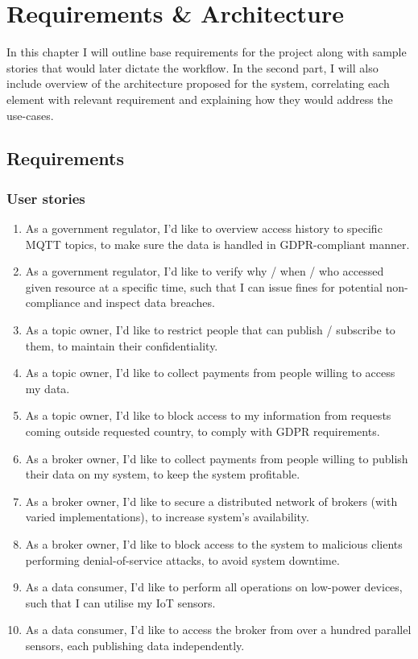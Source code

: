 \chapter{Requirements \& Architecture}
In this chapter I will outline base requirements for the project along with sample stories that would later dictate the workflow. In the second part, I will also include overview of the architecture proposed for the system, correlating each element with relevant requirement and explaining how they would address the use-cases.

\section{Requirements}

\subsection{User stories}

\begin{enumerate}
\item As a government regulator, I'd like to overview access history to specific MQTT topics, to make sure the data is handled in GDPR-compliant manner.
\item As a government regulator, I'd like to verify why / when / who accessed given resource at a specific time, such that I can issue fines for potential non-compliance and inspect data breaches.
\item As a topic owner, I'd like to restrict people that can publish / subscribe to them, to maintain their confidentiality.
\item As a topic owner, I'd like to collect payments from people willing to access my data.
\item As a topic owner, I'd like to block access to my information from requests coming outside requested country, to comply with GDPR requirements.
\item As a broker owner, I'd like to collect payments from people willing to publish their data on my system, to keep the system profitable.
\item As a broker owner, I'd like to secure a distributed network of brokers (with varied implementations), to increase system's availability. 
\item As a broker owner, I'd like to block access to the system to malicious clients performing denial-of-service attacks, to avoid system downtime.
\item As a data consumer, I'd like to perform all operations on low-power devices, such that I can utilise my IoT sensors.
\item As a data consumer, I'd like to access the broker from over a hundred parallel sensors, each publishing data independently.
\end{enumerate}

